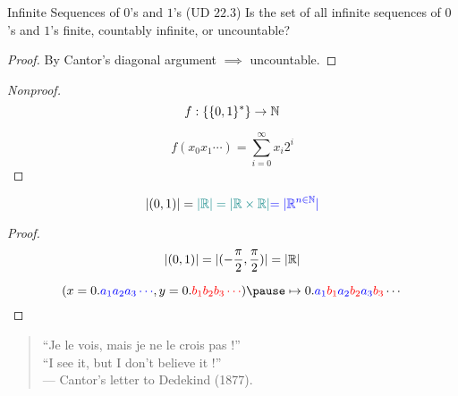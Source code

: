 \begin{frame}{}
  \begin{exampleblock}{Infinite Sequences of $0$'s and $1$'s (UD $22.3$)}
    Is the set of all infinite sequences of $0$'s and $1$'s finite,
    countably infinite, or uncountable?
  \end{exampleblock}

  \pause
  \vspace{0.50cm}
  \begin{proof}
    By Cantor's diagonal argument $\implies$ uncountable.
  \end{proof}

  \pause
  \vspace{0.30cm}
  \begin{proof}[Nonproof]
    \[
      f: \{\{0,1\}^{\ast}\} \to \mathbb{N}
    \]

    \[
      f(x_0 x_1 \cdots) = \sum_{i=0}^{\infty} x_i 2^{i}
    \]
  \end{proof}
\end{frame}

\begin{frame}{}
  \begin{theorem}[$|\R|$ (1877)]
    \[
      |(0,1)| = \textcolor{teal}{|\mathbb{R}| = |\mathbb{R} \times \mathbb{R}|} \textcolor{blue}{= |\mathbb{R}^{n \in \mathbb{N}}|}
    \]
  \end{theorem}

  \begin{proof}
    \pause
    \[
      |(0,1)| = |(-\frac{\pi}{2}, \frac{\pi}{2})| = |\mathbb{R}|
    \]

    \pause
    \[
      (x = 0.\blue{a_1 a_2 a_3 \cdots}, y = 0.\red{b_1 b_2 b_3 \cdots}) \pause \mapsto 0.\blue{a_1}\red{b_1}\blue{a_2}\red{b_2}\blue{a_3}\red{b_3}\cdots
    \]
  \end{proof}

  \pause
  \vspace{0.30cm}
  \begin{quote}
    \begin{center}
      ``Je le vois, mais je ne le crois pas !'' \\[4pt]
      ``I see it, but I don't believe it !'' \\[5pt]
      \hfill --- Cantor's letter to Dedekind (1877). 
    \end{center}
  \end{quote}

  \pause
  \centerline{}
\end{frame}
